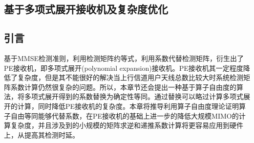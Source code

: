 \documentclass[bachelor,nocolorlinks, printoneside]{seuthesis} %
\begin{document}
\begin{Main}
\chapter{基于多项式展开接收机及复杂度优化}
\section{引言}
基于MMSE检测准则，利用检测矩阵约等式，利用系数代替检测矩阵，衍生出了PE接收机，即多项式展开(polynomial expansion)接收机。PE接收机其一定程度降低了复杂度，但是其不能很好的解决当上行信道用户天线总数比较大时系统检测矩阵系数计算仍然很复杂的问题。所以，本章节还会提出一种基于算子自由度的算法，将多项式展开得到的系数替换为确定性等同。通过替换可以略过计算多项式展开的计算，同时降低PE接收机的复杂度。本章将推导利用算子自由度理论证明算子自由等同能够代替系数，在PE接收机的基础上进一步的降低大规模MIMO的计算复杂度，并且涉及到的小规模的矩阵求逆和递推系数计算将更容易应用到硬件上，从提高其检测时延。

\end{Main}
\end{document}
